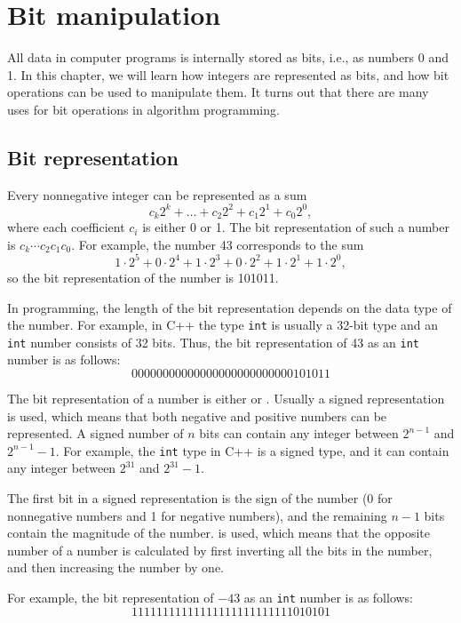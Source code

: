 \chapter{Bit manipulation}

All data in computer programs is internally stored as bits,
i.e., as numbers 0 and 1.
In this chapter, we will learn how integers
are represented as bits, and how bit operations
can be used to manipulate them.
It turns out that there are many uses for
bit operations in algorithm programming.

\section{Bit representation}


Every nonnegative integer can be represented as a sum
\[c_k 2^k + \ldots + c_2 2^2 + c_1 2^1 + c_0 2^0,\]
where each coefficient $c_i$ is either 0 or 1.
The bit representation of such a number is
$c_k \cdots c_2 c_1 c_0$.
For example, the number 43 corresponds to the sum
\[1 \cdot 2^5 + 0 \cdot 2^4 + 1 \cdot 2^3 + 0 \cdot 2^2 + 1 \cdot 2^1 + 1 \cdot 2^0,\]
so the bit representation of the number is 101011.

In programming, the length of the bit representation
depends on the data type of the number.
For example, in C++ the type \texttt{int} is
usually a 32-bit type and an \texttt{int} number
consists of 32 bits.
Thus, the bit representation of 43
as an \texttt{int} number is as follows:
\[00000000000000000000000000101011\]

The bit representation of a number is either
 or .
Usually a signed representation is used,
which means that both negative and positive
numbers can be represented.
A signed number of $n$ bits can contain any
integer between $2^{n-1}$ and $2^{n-1}-1$.
For example, the \texttt{int} type in C++ is
a signed type, and it can contain any
integer between $2^{31}$ and $2^{31}-1$.

The first bit in a signed representation
is the sign of the number (0 for nonnegative numbers
and 1 for negative numbers), and
the remaining $n-1$ bits contain the magnitude of the number.
 is used, which means that the
opposite number of a number is calculated by first
inverting all the bits in the number,
and then increasing the number by one.

For example, the bit representation of $-43$
as an \texttt{int} number is as follows:
\[11111111111111111111111111010101\]

